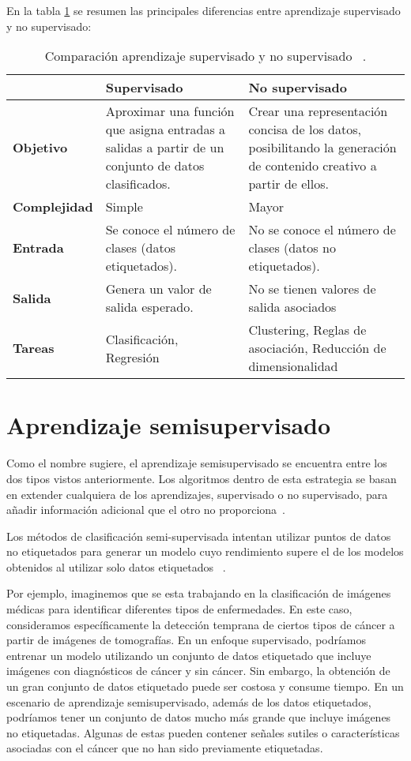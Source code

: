En la tabla \ref{supervisado_VS_noSupervisado} se resumen las principales diferencias entre aprendizaje supervisado y no supervisado:
\begin{table}[ht]
	\centering
	\begin{tabular}{@{}p{2.5cm} p{5cm} p{5cm}@{}}
		\toprule
			 & \textbf{Supervisado} & \textbf{No supervisado} \\
		\midrule
		\textbf{Objetivo} & Aproximar una función que asigna entradas a salidas a partir de un conjunto de datos clasificados. & Crear una representación concisa de los datos, posibilitando la generación de contenido creativo a partir de ellos. \\
		\addlinespace[0.5em]
		\textbf{Complejidad} & Simple & Mayor\\
		\addlinespace[0.5em]
		\textbf{Entrada} & Se conoce el número de clases (datos etiquetados). & No se conoce el número de clases (datos no etiquetados). \\
		\addlinespace[0.5em]
		\textbf{Salida} & Genera un valor de salida esperado. & No se tienen valores de salida asociados \\
		\addlinespace[0.5em]
		\textbf{Tareas} & Clasificación, Regresión & Clustering, Reglas de asociación, Reducción de dimensionalidad \\
		\bottomrule
	\end{tabular}
	\caption{Comparación aprendizaje supervisado y no supervisado ~\cite{USL:guide}.}
	\label{supervisado_VS_noSupervisado}
\end{table}
\newpage


\section{Aprendizaje semisupervisado}
Como el nombre sugiere, el aprendizaje semisupervisado se encuentra entre los dos tipos vistos anteriormente. Los algoritmos dentro de esta estrategia se basan en extender cualquiera de los aprendizajes, supervisado o no supervisado, para añadir información adicional que el otro no proporciona~\cite{Intro:SemiSupervised}.

Los métodos de clasificación semi-supervisada intentan utilizar puntos de datos no etiquetados para generar un modelo cuyo rendimiento supere el de los modelos obtenidos al utilizar solo datos etiquetados ~\cite{Engelen:semi-supervised}. 

Por ejemplo, imaginemos que se esta trabajando en la clasificación de imágenes médicas para identificar diferentes tipos de enfermedades. En este caso, consideramos específicamente la detección temprana de ciertos tipos de cáncer a partir de imágenes de tomografías. En un enfoque supervisado, podríamos entrenar un modelo utilizando un conjunto de datos etiquetado que incluye imágenes con diagnósticos de cáncer y sin cáncer. Sin embargo, la obtención de un gran conjunto de datos etiquetado puede ser costosa y consume tiempo. En un escenario de aprendizaje semisupervisado, además de los datos etiquetados, podríamos tener un conjunto de datos mucho más grande que incluye imágenes no etiquetadas. Algunas de estas pueden contener señales sutiles o características asociadas con el cáncer que no han sido previamente etiquetadas.

